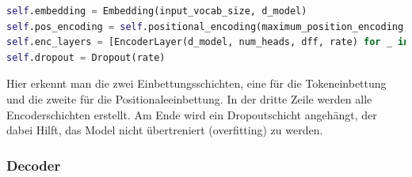 \begin{lstlisting}[language=Python, caption={Encoder}]
self.embedding = Embedding(input_vocab_size, d_model)
self.pos_encoding = self.positional_encoding(maximum_position_encoding, self.d_model)
self.enc_layers = [EncoderLayer(d_model, num_heads, dff, rate) for _ in range(self.num_layers)]
self.dropout = Dropout(rate)
\end{lstlisting}

Hier erkennt man die zwei Einbettungsschichten, eine für die Tokeneinbettung und die zweite für die Positionaleeinbettung. In der dritte Zeile werden alle Encoderschichten erstellt. Am Ende wird ein Dropoutschicht angehängt, der dabei Hilft, das Model nicht übertreniert (overfitting) zu werden.

\subsubsection{Decoder}



